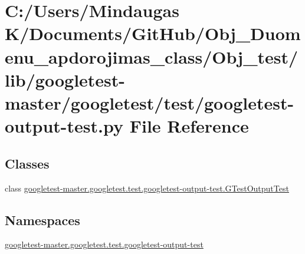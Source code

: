\hypertarget{_obj__test_2lib_2googletest-master_2googletest_2test_2googletest-output-test_8py}{}\section{C\+:/\+Users/\+Mindaugas K/\+Documents/\+Git\+Hub/\+Obj\+\_\+\+Duomenu\+\_\+apdorojimas\+\_\+class/\+Obj\+\_\+test/lib/googletest-\/master/googletest/test/googletest-\/output-\/test.py File Reference}
\label{_obj__test_2lib_2googletest-master_2googletest_2test_2googletest-output-test_8py}
\subsection*{Classes}
\begin{DoxyCompactItemize}
\item 
class \mbox{\hyperlink{classgoogletest-master_1_1googletest_1_1test_1_1googletest-output-test_1_1_g_test_output_test}{googletest-\/master.\+googletest.\+test.\+googletest-\/output-\/test.\+G\+Test\+Output\+Test}}
\end{DoxyCompactItemize}
\subsection*{Namespaces}
\begin{DoxyCompactItemize}
\item 
 \mbox{\hyperlink{namespacegoogletest-master_1_1googletest_1_1test_1_1googletest-output-test}{googletest-\/master.\+googletest.\+test.\+googletest-\/output-\/test}}
\end{DoxyCompactItemize}
